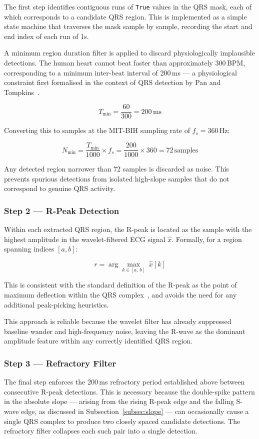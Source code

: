 \documentclass[11pt]{article}
\begin{document}
The first step identifies contiguous runs of \texttt{True} values in the QRS mask, each of which corresponds to a candidate QRS region. This is implemented as a simple state machine that traverses the mask sample by sample, recording the start and end index of each run of 1s.

A minimum region duration filter is applied to discard physiologically implausible detections.
The human heart cannot beat faster than approximately 300\,BPM, corresponding to a minimum inter-beat interval of 200\,ms — a physiological constraint first formalised in the context of QRS detection by Pan and Tompkins~\cite{pan_real-time_1985}.

$$T_{\min} = \frac{60}{300} = 200\,\text{ms}$$

Converting this to samples at the MIT-BIH sampling rate of $f_s = 360$\,Hz:

$$N_{\min} = \frac{T_{\min}}{1000} \times f_s = \frac{200}{1000} \times 360 = 72\,\text{samples}$$

Any detected region narrower than 72 samples is discarded as noise. This prevents spurious detections from isolated high-slope samples that do not correspond to genuine QRS activity.

\subsubsection*{Step 2 — R-Peak Detection}

Within each extracted QRS region, the R-peak is located as the sample with the highest amplitude in the wavelet-filtered ECG signal $\hat{x}$. Formally, for a region spanning indices $[a, b]$:

$$r = \arg\max_{k \in [a,\, b]}\; \hat{x}[k]$$

This is consistent with the standard definition of the R-peak as the point of maximum deflection within the QRS complex~\cite{dogan_comprehensive_2023}, and avoids the need for any additional peak-picking heuristics.

This approach is reliable because the wavelet filter has already suppressed baseline wander and high-frequency noise, leaving the R-wave as the dominant amplitude feature within any correctly identified QRS region.

\subsubsection*{Step 3 — Refractory Filter}

The final step enforces the 200\,ms refractory period established above between consecutive R-peak detections. This is necessary because the double-spike pattern in the absolute slope — arising from the rising R-peak edge and the falling S-wave edge, as discussed in Subsection~\ref{subsec:slope} — can occasionally cause a single QRS complex to produce two closely spaced 
candidate detections. The refractory filter collapses each such pair into a single detection.
\end{document}
